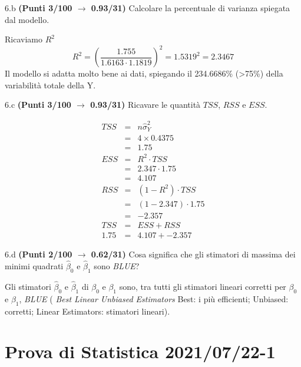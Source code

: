 \documentclass[
  11pt,
]{book}
\theoremstyle{mytheoremstyle}
\theoremstyle{mydefstyle}
\newenvironment{sol}
  {
  \begin{tcolorbox}[enhanced,breakable,arc=0.1mm,boxrule=1pt,colback=white,colframe=iblue,
  title=\bf \fontfamily{lmss}\selectfont \hspace{.5 cm} Soluzione,drop fuzzy shadow]

}{
\end{tcolorbox}
  }
\begin{document}
6.b \textbf{(Punti 3/100 \(\rightarrow\) 0.93/31)} Calcolare la percentuale di varianza spiegata dal modello.

\begin{sol}
Ricaviamo \(R^2\)
\[
R^2=\left(\frac{1.755}{1.6163\cdot 1.1819}\right)^2=1.5319^2=2.3467
\]
Il modello si adatta molto bene ai dati, spiegando il 234.6686\% (\textgreater75\%) della variabilità totale della Y.

\end{sol}

6.c \textbf{(Punti 3/100 \(\rightarrow\) 0.93/31)} Ricavare le quantità \(TSS\), \(RSS\) e \(ESS\).

\begin{sol}
\begin{eqnarray*}
   TSS &=& n\hat\sigma^2_Y\\
      &=& 4 \times 0.4375 \\
      &=&  1.75 \\
   ESS &=& R^2\cdot TSS\\
      &=&  2.347 \cdot 1.75 \\
      &=& 4.107 \\
   RSS &=& (1-R^2)\cdot TSS\\
      &=& (1- 2.347 )\cdot 1.75 \\
      &=&  -2.357 \\
   TSS &=& ESS+RSS \\ 1.75  &=&  4.107 + -2.357 
  \end{eqnarray*}

\end{sol}

6.d \textbf{(Punti 2/100 \(\rightarrow\) 0.62/31)} Cosa significa che gli stimatori di massima dei minimi quadrati \(\hat\beta_0\) e \(\hat\beta_1\) sono \emph{BLUE}?

\begin{sol}
Gli stimatori \(\hat\beta_{0}\) e \(\hat\beta_{1}\) di \(\beta_{0}\) e \(\beta_{1}\)
sono, tra tutti gli stimatori lineari corretti per \(\beta_0\) e \(\beta_1\), \emph{BLUE}
( \emph{Best Linear Unbiased Estimators} Best: i più efficienti; Unbiased: corretti;
Linear Estimators: stimatori lineari).

\end{sol}

\section{Prova di Statistica 2021/07/22-1}\label{prova-di-statistica-20210722-1}
\end{document}
